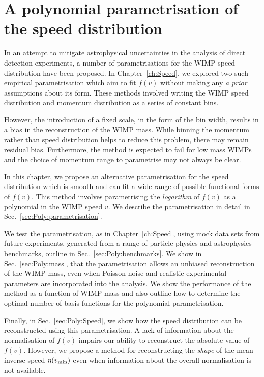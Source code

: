 \chapter{A polynomial parametrisation of the speed distribution}
\label{ch:Poly}


In an attempt to mitigate astrophysical uncertainties in the analysis of direct detection experiments, a number of parametrisations for the WIMP speed distribution have been proposed. In Chapter~\ref{ch:Speed}, we explored two such empirical parametrisation which aim to fit $f(v)$ without making any \textit{a prior} assumptions about its form. These methods involved writing the WIMP speed distribution and momentum distribution as a series of constant bins.

However, the introduction of a fixed scale, in the form of the bin width, results in a bias in the reconstruction of the WIMP mass. While binning the momentum rather than speed distribution helps to reduce this problem, there may remain residual bias. Furthermore, the method is expected to fail for low mass WIMPs and the choice of momentum range to parametrise may not always be clear.

In this chapter, we propose an alternative parametrisation for the speed distribution which is smooth and can fit a wide range of possible functional forms of $f(v)$. This method involves parametrising the \textit{logarithm} of $f(v)$ as a polynomial in the WIMP speed $v$. We describe the parametrisation in detail in Sec.~\ref{sec:Poly:parametrisation}.

We test the parametrisation, as in Chapter~\ref{ch:Speed}, using mock data sets from future experiments, generated from a range of particle physics and astrophysics benchmarks, outline in Sec.~\ref{sec:Poly:benchmarks}. We show in Sec.~\ref{sec:Poly:mass}, that the parametrisation allows an unbiased reconstruction of the WIMP mass, even when Poisson noise and realistic experimental parameters are incorporated into the analysis. We show the performance of the method as a function of WIMP mass and also outline how to determine the optimal number of basis functions for the polynomial parametrisation.

Finally, in Sec.~\ref{sec:Poly:Speed}, we show how the speed distribution can be reconstructed using this parametrisation. A lack of information about the normalisation of $f(v)$ impairs our ability to reconstruct the absolute value of $f(v)$. However, we propose a method for reconstructing the \textit{shape} of the mean inverse speed $\eta(\vmin)$ even when information about the overall normalisation is not available.

